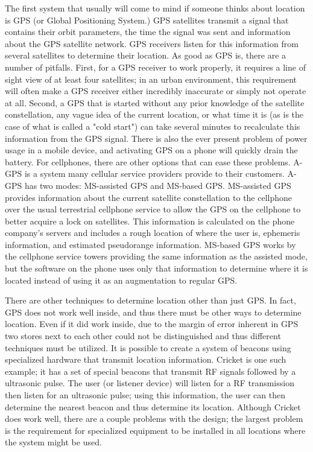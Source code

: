\documentclass{acm_proc_article-sp}
\begin{document}
The first system that usually will come to mind if someone thinks about location is GPS (or Global Positioning System.)  GPS satellites transmit a signal that contains their orbit parameters, the time the signal was sent and information about the GPS satellite network.  GPS receivers listen for this information from several satellites to determine their location. \cite{hofmann1997global}  As good as GPS is, there are a number of pitfalls.  First, for a GPS receiver to work properly, it requires a line of sight view of at least four satellites; in an urban environment, this requirement will often make a GPS receiver either incredibly inaccurate or simply not operate at all.  Second, a GPS that is started without any prior knowledge of the satellite constellation, any vague idea of the current location, or what time it is (as is the case of what is called a "cold start") can take several minutes to recalculate this information from the GPS signal.  There is also the ever present problem of power usage in a mobile device, and activating GPS on a phone will quickly drain the battery.  \cite{djuknic2002geolocation}  For cellphones, there are other options that can ease these problems.  A-GPS is a system many cellular service providers provide to their customers.  A-GPS has two modes: MS-assisted GPS and MS-based GPS. MS-assisted GPS provides information about the current  satellite constellation to the cellphone over the usual terrestrial cellphone service to allow the GPS on the cellphone to better acquire a lock on satellites.  This information is calculated on the phone company's servers and includes a rough location of where the user is, ephemeris information, and estimated pseudorange information. MS-based GPS works by the cellphone service towers providing the same information as the assisted mode, but the software on the phone uses only that information to determine where it is located instead of using it as an augmentation to regular GPS. \cite{sun2005signal}

There are other techniques to determine location other than just GPS.  In fact, GPS does not work well inside, and thus there must be other ways to determine location.  Even if it did work inside, due to the margin of error inherent in GPS two stores next to each other could not be distinguished and thus different techniques must be utilized. It is possible to create a system of beacons using specialized hardware that transmit location information.  Cricket is one such example; it has a set of special beacons that transmit RF signals followed by a ultrasonic pulse.  The user (or listener device) will listen for a RF transmission then listen for an ultrasonic pulse; using this information, the user can then determine the nearest beacon and thus determine its location.  Although Cricket does work well, there are a couple problems with the design; the largest problem is the requirement for specialized equipment to be installed in all locations where the system might be used. \cite{priyantha2000cricket}  
\end{document}

